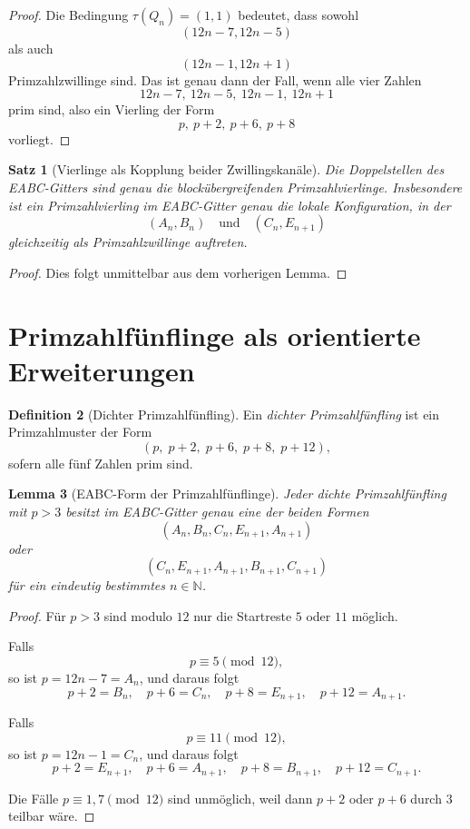 \documentclass[11pt,a4paper]{article}
\newtheorem{satz}{Satz}
\newtheorem{lemma}[satz]{Lemma}
\theoremstyle{definition}
\newtheorem{definition}[satz]{Definition}
\theoremstyle{remark}
\newcommand{\N}{\mathbb{N}}
\begin{document}
	\begin{proof}
		Die Bedingung \(\tau(Q_n)=(1,1)\) bedeutet, dass sowohl
		\[
		(12n-7,12n-5)
		\]
		als auch
		\[
		(12n-1,12n+1)
		\]
		Primzahlzwillinge sind. Das ist genau dann der Fall, wenn alle vier Zahlen
		\[
		12n-7,\ 12n-5,\ 12n-1,\ 12n+1
		\]
		prim sind, also ein Vierling der Form
		\[
		p,\ p+2,\ p+6,\ p+8
		\]
		vorliegt.
	\end{proof}
	
	\begin{satz}[Vierlinge als Kopplung beider Zwillingskanäle]
		Die Doppelstellen des EABC-Gitters sind genau die blockübergreifenden Primzahlvierlinge.
		Insbesondere ist ein Primzahlvierling im EABC-Gitter genau die lokale Konfiguration, in der
		\[
		(A_n,B_n)
		\quad\text{und}\quad
		(C_n,E_{n+1})
		\]
		gleichzeitig als Primzahlzwillinge auftreten.
	\end{satz}
	
	\begin{proof}
		Dies folgt unmittelbar aus dem vorherigen Lemma.
	\end{proof}
	
	\section{Primzahlfünflinge als orientierte Erweiterungen}
	
	\begin{definition}[Dichter Primzahlfünfling]
		Ein \emph{dichter Primzahlfünfling} ist ein Primzahlmuster der Form
		\[
		(p,\;p+2,\;p+6,\;p+8,\;p+12),
		\]
		sofern alle fünf Zahlen prim sind.
	\end{definition}
	
	\begin{lemma}[EABC-Form der Primzahlfünflinge]
		Jeder dichte Primzahlfünfling mit \(p>3\) besitzt im EABC-Gitter genau eine der beiden Formen
		\[
		(A_n,B_n,C_n,E_{n+1},A_{n+1})
		\]
		oder
		\[
		(C_n,E_{n+1},A_{n+1},B_{n+1},C_{n+1})
		\]
		für ein eindeutig bestimmtes \(n\in\N\).
	\end{lemma}
	
	\begin{proof}
		Für \(p>3\) sind modulo \(12\) nur die Startreste \(5\) oder \(11\) möglich.
		
		Falls
		\[
		p\equiv 5 \pmod{12},
		\]
		so ist \(p=12n-7=A_n\), und daraus folgt
		\[
		p+2=B_n,\quad p+6=C_n,\quad p+8=E_{n+1},\quad p+12=A_{n+1}.
		\]
		
		Falls
		\[
		p\equiv 11 \pmod{12},
		\]
		so ist \(p=12n-1=C_n\), und daraus folgt
		\[
		p+2=E_{n+1},\quad p+6=A_{n+1},\quad p+8=B_{n+1},\quad p+12=C_{n+1}.
		\]
		
		Die Fälle \(p\equiv 1,7\pmod{12}\) sind unmöglich, weil dann \(p+2\) oder \(p+6\) durch \(3\)
		teilbar wäre.
	\end{proof}
	
\end{document}
